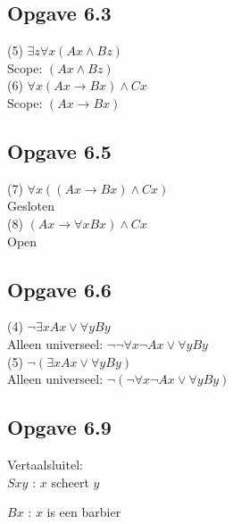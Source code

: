 \documentclass[11pt]{article}
\newcommand{\E}{\exists}
\newcommand{\A}{\forall}
\begin{document}

  \subsection*{Opgave 6.3}

  (5) $\E z\A x(Ax \wedge Bz)$ \\

  Scope: $(Ax \wedge Bz)$ \\

  (6) $\A x(Ax \rightarrow Bx) \wedge Cx$ \\

  Scope: $(Ax \rightarrow Bx)$


  \subsection*{Opgave 6.5}

  (7) $\A x((Ax \rightarrow Bx) \wedge Cx)$ \\

  Gesloten \\

  (8) $(Ax \rightarrow \A xBx) \wedge Cx$ \\

  Open \\


  \subsection*{Opgave 6.6}

  (4) $\neg \E xAx \vee \A yBy$ \\

  Alleen universeel: $\neg \neg \A x \neg Ax \vee \A yBy$ \\

  (5) $\neg (\E xAx \vee \A yBy)$ \\

  Alleen universeel: $\neg (\neg \A x \neg Ax \vee \A yBy)$


  \subsection*{Opgave 6.9}

  Vertaalsluitel: \\

  $Sxy$ : $x$ scheert $y$

  $Bx$ : $x$ is een barbier
\end{document}
